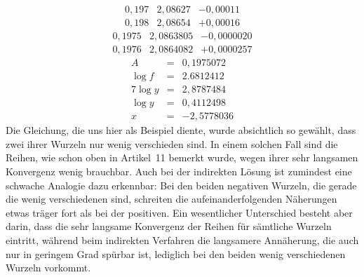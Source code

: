 \[
\begin{array}{r|r|r}
0{,}197&2{,}08627&-0{,}00011\\
0{,}198&2{,}08654&+0{,}00016
\end{array}
\]
\[
\begin{array}{r|r|r}
0{,}1975&2{,}0863805&-0{,}0000020\\
0{,}1976&2{,}0864082&+0{,}0000257
\end{array}
\]
\[
\begin{array}{rcl}
A&=&0{,}1975072\\
\log f&=&2.6812412\\\hline
7\log y&=&2{,}8787484\\
\log y&=&0{,}4112498\\
x&=&-2{,}5778036
\end{array}
\]
Die Gleichung, die uns hier als Beispiel diente, wurde absichtlich so gewählt, dass zwei ihrer Wurzeln nur wenig verschieden sind. In einem solchen Fall sind die Reihen, wie schon oben in Artikel\ 11 bemerkt wurde, wegen ihrer sehr langsamen Konvergenz wenig brauchbar. Auch bei der indirekten Lösung ist zumindest eine schwache Analogie dazu erkennbar: Bei den beiden negativen Wurzeln, die gerade die wenig verschiedenen sind, schreiten die aufeinanderfolgenden Näherungen etwas träger fort als bei der positiven. Ein wesentlicher Unterschied besteht aber darin, dass die sehr langsame Konvergenz der Reihen für sämtliche Wurzeln eintritt, während beim indirekten Verfahren die langsamere Annäherung, die auch nur in geringem Grad spürbar ist, lediglich bei den beiden wenig verschiedenen Wurzeln vorkommt.

